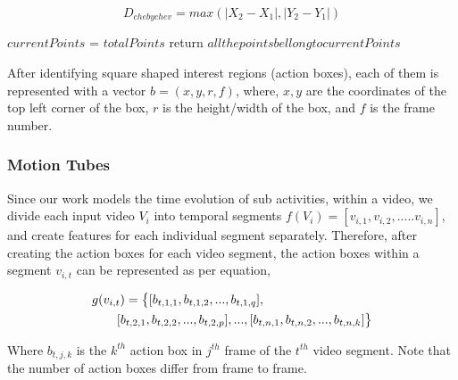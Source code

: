 \begin{equation}\label{eq:chebichev}
 D_{chebychev} = max(|X_{2} - X_{1}|,|Y_{2}-Y_{1}|)
\end{equation}

\begin{algorithm}
   \caption{}
   \label{alg:boundary removal}
    \begin{algorithmic}[1]
	\State $currentPoints$ = $totalPoints$
	    \State return $all the points bellong to currentPoints$
	  \EndIf
	  
	\EndWhile
     \EndFunction

     
\end{algorithmic}
\end{algorithm}

After identifying square shaped interest regions (action boxes), each of them is represented with a vector $b = (x,y,r,f)$, where, $x,y$ are the coordinates
of the top left corner of the box, $r$ is the height/width of the box, and $f$ is the frame number. 


\subsubsection{Motion Tubes}
Since our work models the time evolution of sub activities, within a video, we divide each input video $V_{i}$ into temporal segments $f(V_{i}) = [v_{i,1},
v_{i,2},.....v_{i,n}]$,
and create features for each individual segment separately. Therefore, after creating the action boxes for each video segment,
the action boxes within a segment $v_{i,t}$ can be represented as per equation, 

\begin{equation} 
\label{eqn:action box}
\begin{split}
\MoveEqLeft
 g(v_{i,t}) = \big\{[b_{t,1,1},b_{t,1,2},...,b_{t,1,q}],\\
 & [b_{t,2,1},b_{t,2,2},...,b_{t,2,p}],...,[b_{t,n,1},b_{t,n,2},...,b_{t,n,k}]\big\}
\end{split}
\end{equation}

Where $b_{t,j,k}$ is the $k^{th}$ action box in $j^{th}$ frame of the $t^{th}$ video segment. Note that the number of
action boxes differ from frame to frame.

